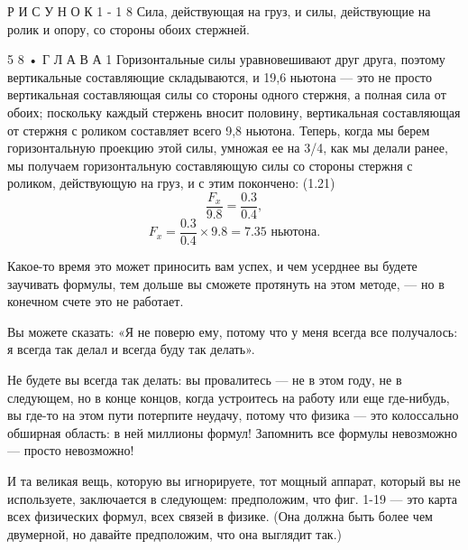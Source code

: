 \documentclass[10pt,oneside]{article}
\newcommand{\TipsSubsection}[1]{\par\vspace{6bp}{\normalsize\bfseries #1\par}\vspace{2bp}}
\begin{document}
Р И С У Н О К  1 - 1 8 Сила, действующая на груз, и силы, действующие на ролик и опору, со стороны обоих стержней.\par

5 8 • Г Л А В А  1 Горизонтальные силы уравновешивают друг друга, поэтому вертикальные составляющие складываются, и 19,6 ньютона --- это не просто вертикальная составляющая силы со стороны одного стержня, а полная сила от обоих; поскольку каждый стержень вносит половину, вертикальная составляющая от стержня с роликом составляет всего 9,8 ньютона. Теперь, когда мы берем горизонтальную проекцию этой силы, умножая ее на 3/4, как мы делали ранее, мы получаем горизонтальную составляющую силы со стороны стержня с роликом, действующую на груз, и с этим покончено: (1.21) \[\frac{F_x}{9.8} = \frac{0.3}{0.4},\] \[F_x = \frac{0.3}{0.4} \times 9.8 = 7.35 \text{ ньютона}.\]\par

\TipsSubsection{1-10 Триангуляция У меня осталось еще несколько минут, поэтому мне хотелось бы сказать пару слов о связи математики с физикой --- связи, которая, собственно, была хорошо проиллюстрирована этим простым примером. Бесполезно просто заучивать формулы и говорить себе: «Я знаю все формулы; мне нужно лишь сообразить, как подставить их в задачу!»}

Какое-то время это может приносить вам успех, и чем усерднее вы будете заучивать формулы, тем дольше вы сможете протянуть на этом методе, --- но в конечном счете это не работает.\par

Вы можете сказать: «Я не поверю ему, потому что у меня всегда все получалось: я всегда так делал и всегда буду так делать».\par

Не будете вы всегда так делать: вы провалитесь --- не в этом году, не в следующем, но в конце концов, когда устроитесь на работу или еще где-нибудь, вы где-то на этом пути потерпите неудачу, потому что физика --- это колоссально обширная область: в ней миллионы формул! Запомнить все формулы невозможно --- просто невозможно!\par

И та великая вещь, которую вы игнорируете, тот мощный аппарат, который вы не используете, заключается в следующем: предположим, что фиг. 1-19 --- это карта всех физических формул, всех связей в физике. (Она должна быть более чем двумерной, но давайте предположим, что она выглядит так.)\par
\end{document}
